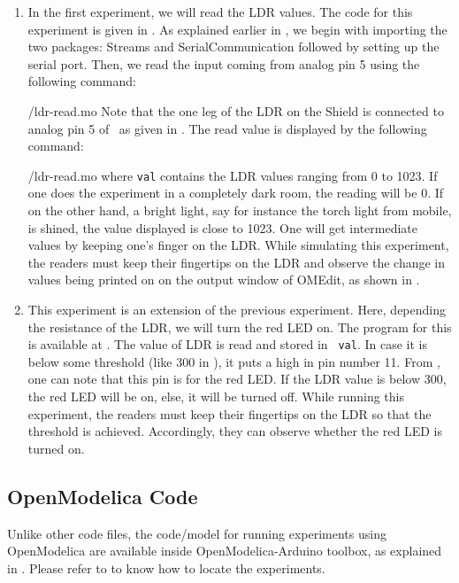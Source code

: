\begin{enumerate}
  \item In the first experiment, we will read the LDR values. The code for this experiment is given in
         . As explained earlier in , 
        we begin with importing the two packages: Streams and SerialCommunication followed 
        by setting up the serial port. Then, we read the input coming from analog pin 5 using the 
        following command:
        
        {\LocLDROpenModelicacode/ldr-read.mo} Note that the one leg of the LDR on
        the Shield is connected to analog pin 5 of \arduino\, 
        as given in . The read value is displayed 
        by the following command: 
        
        {\LocLDROpenModelicacode/ldr-read.mo} where {\tt val} contains
        the LDR values ranging from 0 to 1023. If one does the experiment in a completely dark room, the
        reading will be 0. If on the other hand, a bright light, say for instance the torch
        light from mobile, is shined, the value displayed is close to 1023. One will get
        intermediate values by keeping one's finger on the LDR. While simulating this experiment, the readers must keep their fingertips on the LDR and
        observe the change in values being printed on on the output window of OMEdit, as shown in .
        
  \item This experiment is an extension of the previous experiment. Here, depending the resistance of the LDR, we will
        turn the red LED on.  The program for this is available at
        .  The value of LDR is read and stored in {\tt
            val}.  In case it is below some threshold (like 300 in ), 
        it puts a high in pin number 11. From , 
        one can note that this pin is for the red LED. If the LDR value is below 300, 
        the red LED will be on, else, it will be turned off. While running this experiment, the readers 
        must keep their fingertips on the LDR so that the threshold is achieved. Accordingly, 
        they can observe whether the red LED is turned on. 
\end{enumerate}

\subsection{OpenModelica Code}
Unlike other code files, the code/model for running experiments using OpenModelica are 
available inside OpenModelica-Arduino toolbox, as explained in .
Please refer to  to know how to locate the experiments. 

